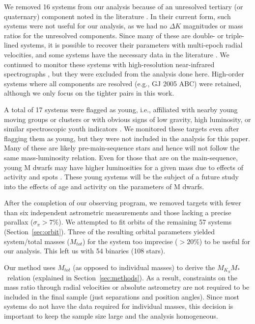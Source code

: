\documentclass[twocolumn]{aastex62}
\newcommand{\mmk}{$M_{K_S}$\textendash$M_*$}
\begin{document}
We removed 16 systems from our analysis because of an unresolved tertiary (or quaternary) component noted in the literature \citep[e.g.,][]{2010ApJ...720.1727L,2002A&A...382..118T,2018ApJS..235....6T}. In their current form, such systems were not useful for our analysis, as we had no $\Delta K$ magnitudes or mass ratios for the unresolved components. Since many of these are double- or triple-lined systems, it is possible to recover their parameters with multi-epoch radial velocities, and some systems have the necessary data in the literature \citep[e.g.,][]{Sgr2000}. We continued to monitor these systems with high-resolution near-infrared spectrographs \citep{2010SPIE.7735E..1MY, 2012SPIE.8446E..2CR, Park2014}, but they were excluded from the analysis done here. High-order systems where all components are resolved (e.g., GJ 2005 ABC) were retained, although we only focus on the tighter pairs in this work. 

A total of 17 systems were flagged as young, i.e., affiliated with nearby young moving groups or clusters or with obvious signs of low gravity, high luminosity, or similar spectroscopic youth indicators \citep{Shkolnik2012, Kraus2014, Gagne2014, Malo2014a, Gagne2015, 2017AJ....153...95R, 2017AJ....154...69S, Rizzuto2017, 2018MNRAS.475.2955L}. We monitored these targets even after flagging them as young, but they were not included in the analysis for this paper. Many of these are likely pre-main-sequence stars and hence will not follow the same mass-luminosity relation. Even for those that are on the main-sequence, young M dwarfs may have higher luminosities for a given mass due to effects of activity and spots \citep[e.g.,][]{2015ApJ...807....3K,Stassun2012,Somers2017}. These young systems will be the subject of a future study into the effects of age and activity on the parameters of M dwarfs. 

After the completion of our observing program, we removed targets with fewer than six independent astrometric measurements and those lacking a precise parallax ($\sigma_{\pi}>7\%$). We attempted to fit orbits of the remaining 57 systems (Section~\ref{sec:orbit}). Three of the resulting orbital parameters yielded system/total masses ($M_{tot}$) for the system too imprecise ($>20\%$) to be useful for our analysis. This left us with 54 binaries (108 stars).

Our method uses $M_{tot}$ (as opposed to individual masses) to derive the \mmk\ relation (explained in Section~\ref{sec:methods}). As a result, constraints on the mass ratio through radial velocities or absolute astrometry are not required to be included in the final sample (just separations and position angles). Since most systems do not have the data required for individual masses, this decision is important to keep the sample size large and the analysis homogeneous. 
\end{document}
